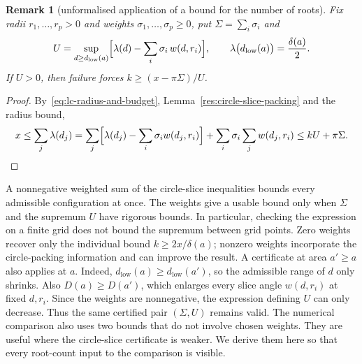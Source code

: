 \documentclass[11pt]{article}
\newtheorem{remark}[theorem]{Remark}
\begin{document}
\begin{remark}[unformalised application of a bound for the number of roots]\label{res:dual-arity-floor}
Fix radii $r_1,\ldots,r_p>0$ and weights $\sigma_1,\ldots,\sigma_p\ge0$, put
$\Sigma=\sum_i\sigma_i$ and
\[
 U=\sup_{d\ge d_{\mathrm{low}}(a)}
   \Bigl[\lambda(d)-\sum_i\sigma_i\,w(d,r_i)\Bigr],
 \qquad
 \lambda\bigl(d_{\mathrm{low}}(a)\bigr)=\frac{\delta(a)}2 .
\]
If $U>0$, then failure forces $k\ge(x-\pi\Sigma)/U$.
\end{remark}


\begin{proof}
By~\eqref{eq:lc-radius-and-budget}, Lemma~\ref{res:circle-slice-packing} and
the radius bound,
\[
 x\le\sum_j\lambda(d_j)
  =\sum_j\Bigl[\lambda(d_j)-\sum_i\sigma_i w(d_j,r_i)\Bigr]
    +\sum_i\sigma_i\sum_j w(d_j,r_i)
  \le kU+\pi\Sigma. \qedhere
\]
\end{proof}

A nonnegative weighted sum of the circle-slice inequalities bounds every
admissible configuration at once. The weights give a
usable bound only when
$\Sigma$ and the supremum $U$ have rigorous bounds. In particular, checking
the expression on a finite grid does not bound the supremum between grid
points. Zero weights recover only the individual bound
$k\ge2x/\delta(a)$; nonzero weights incorporate the circle-packing
information and can improve the result.
A certificate at area $a'\ge a$ also applies at $a$. Indeed,
$d_{\mathrm{low}}(a)\ge d_{\mathrm{low}}(a')$, so the admissible range of
$d$ only shrinks. Also $D(a)\ge D(a')$, which enlarges every slice angle
$w(d,r_i)$ at fixed $d,r_i$. Since the weights are nonnegative, the
expression defining $U$ can only decrease. Thus the same certified pair
$(\Sigma,U)$ remains valid.
The numerical comparison also uses two bounds that do not involve chosen
weights. They are useful where the circle-slice certificate is weaker.
We derive them here so that every root-count input to the comparison is
visible.
\end{document}
